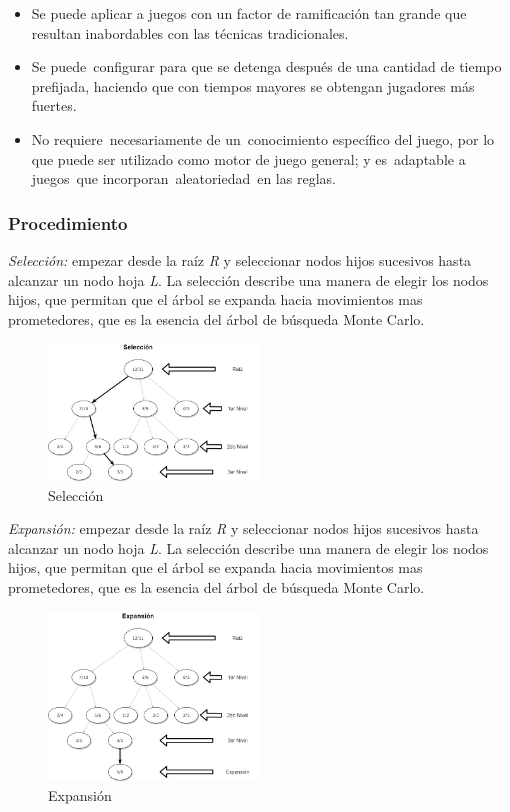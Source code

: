\documentclass[11pt,]{article}
\begin{document}
\begin{itemize}
\item
  Se puede aplicar a juegos con un factor de ramificación tan grande que
  resultan inabordables con las técnicas tradicionales.
\item
  Se puede~configurar para que se detenga después de una cantidad de
  tiempo prefijada, haciendo que con tiempos mayores se obtengan
  jugadores más fuertes.
\item
  No requiere~necesariamente de un~conocimiento específico del juego,
  por lo que puede ser utilizado como motor de juego general; y
  es~adaptable a juegos~que incorporan~aleatoriedad~en las reglas.
\end{itemize}

\newpage

\hypertarget{procedimiento}{%
\subsubsection{Procedimiento}\label{procedimiento}}

\emph{Selección:} empezar desde la raíz \emph{R} y seleccionar nodos
hijos sucesivos hasta alcanzar un nodo hoja \emph{L}. La selección
describe una manera de elegir los nodos hijos, que permitan que el árbol
se expanda hacia movimientos mas prometedores, que es la esencia del
árbol de búsqueda Monte Carlo.

\begin{figure}
\centering
\includegraphics[width=0.5\textwidth,height=\textheight]{./diagramas/seleccion.jpg}
\caption{Selección}
\end{figure}

\emph{Expansión:} empezar desde la raíz \emph{R} y seleccionar nodos
hijos sucesivos hasta alcanzar un nodo hoja \emph{L}. La selección
describe una manera de elegir los nodos hijos, que permitan que el árbol
se expanda hacia movimientos mas prometedores, que es la esencia del
árbol de búsqueda Monte Carlo.

\begin{figure}
\centering
\includegraphics[width=0.5\textwidth,height=\textheight]{./diagramas/expansion.jpg}
\caption{Expansión}
\end{figure}
\end{document}

